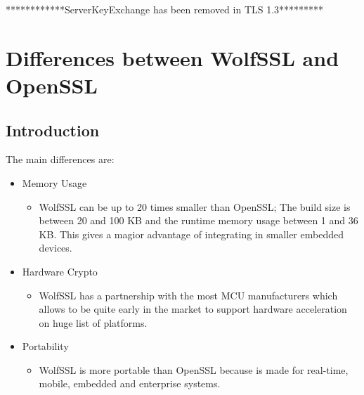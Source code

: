 \documentclass[a4paper,12pt]{report}
\begin{document}
************ServerKeyExchange has been removed in TLS 1.3*********

\chapter{Differences between WolfSSL and OpenSSL}
\section{Introduction}

The main differences are:
\begin{itemize}
\item Memory Usage
\begin{itemize}
\item WolfSSL can be up to 20 times smaller than OpenSSL; The build size is between 20 and 100 KB and the runtime memory usage between 1 and 36 KB. This gives a magior advantage of integrating in smaller embedded devices. 
\end{itemize}
\item Hardware Crypto
\begin{itemize}
\item WolfSSL has a partnership with the most MCU manufacturers which allows to be quite early in the market to support hardware acceleration on huge list of platforms.
\end{itemize}
\item Portability
\begin{itemize}
\item WolfSSL is more portable than OpenSSL because is made for real-time, mobile, embedded and enterprise systems.
\end{itemize}
\end{itemize}
\end{document}
